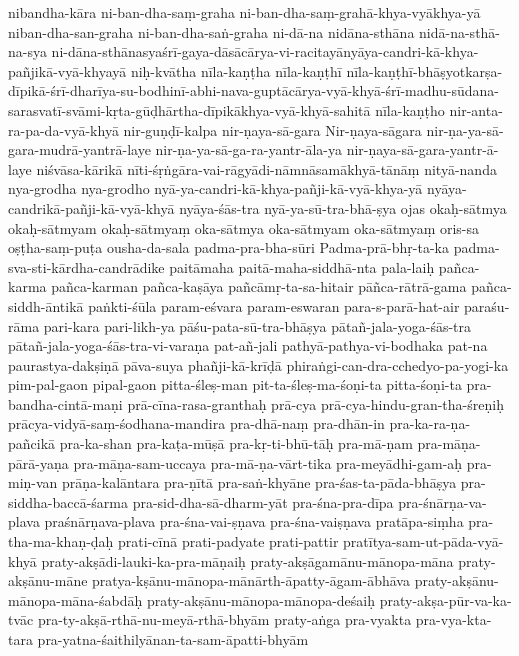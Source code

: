 {    nibandha-kāra
ni-ban-dha-saṃ-graha
ni-ban-dha-saṃ-grahā-khya-vyākhya-yā
niban-dha-san-graha
ni-ban-dha-saṅ-graha
ni-dā-na
    nidāna-sthāna
nidā-na-sthā-na-sya
ni-dāna-sthānasyaśrī-gaya-dāsācārya-vi-racitayānyāya-candri-kā-khya-pañjikā-vyā-khyayā
    niḥ-kvātha
nīla-kaṇṭha
    nīla-kaṇṭhī 
 nīla-kaṇṭhī-bhāṣyotkarṣa-dīpikā-śrī-dharīya-su-bodhinī-abhi-nava-guptācārya-vyā-khyā-śrī-madhu-sūdana-sarasvatī-svāmi-kṛta-gūḍhārtha-dīpikākhya-vyā-khyā-sahitā
    nīla-kaṇṭho
nir-anta-ra-pa-da-vyā-khyā
nir-guṇḍī-kalpa
nir-ṇaya-sā-gara
Nir-ṇaya-sāgara
nir-ṇa-ya-sā-gara-mudrā-yantrā-laye
nir-ṇa-ya-sā-ga-ra-yantr-āla-ya
nir-ṇaya-sā-gara-yantr-ā-laye
niśvāsa-kārikā
nīti-śṛṅgāra-vai-rāgyādi-nāmnāsamākhyā-tānāṃ
nityā-nanda
nya-grodha
nya-grodho
nyā-ya-candri-kā-khya-pañji-kā-vyā-khya-yā
nyāya-candrikā-pañji-kā-vyā-khyā
nyāya-śās-tra
    nyā-ya-sū-tra-bhā-ṣya
ojas
okaḥ-sātmya
okaḥ-sātmyam
okaḥ-sātmyaṃ
oka-sātmya
oka-sātmyam
oka-sātmyaṃ
oris-sa
oṣṭha-saṃ-puṭa
ousha-da-sala
padma-pra-bha-sūri
Padma-prā-bhṛ-ta-ka
padma-sva-sti-kārdha-candrādike
paitāmaha
paitā-maha-siddhā-nta
    pala-laiḥ 
pañca-karma
pañca-karman
pañca-kaṣāya
    pañcāmṛ-ta-sa-hitair
pāñca-rātrā-gama
pañca-siddh-āntikā
paṅkti-śūla
param-eśvara
param-eswaran
    para-s-parā-hat-air
paraśu-rāma
pari-kara
pari-likh-ya
pāśu-pata-sū-tra-bhāṣya
pātañ-jala-yoga-śās-tra
pātañ-jala-yoga-śās-tra-vi-varaṇa
pat-añ-jali
    pathyā-pathya-vi-bodhaka
pat-na
paurastya-dakṣiṇā
pāva-suya
phañji-kā-krīḍā
phiraṅgi-can-dra-cchedyo-pa-yogi-ka
pim-pal-gaon
pipal-gaon
pitta-śleṣ-man
pit-ta-śleṣ-ma-śoṇi-ta
pitta-śoṇi-ta
pra-bandha-cintā-maṇi
prā-cīna-rasa-granthaḥ
prā-cya
prā-cya-hindu-gran-tha-śreṇiḥ
prācya-vidyā-saṃ-śodhana-mandira
    pra-dhā-naṃ
pra-dhān-in
    pra-ka-ra-ṇa-pañcikā
pra-ka-shan
pra-kaṭa-mūṣā
pra-kṛ-ti-bhū-tāḥ
    pra-mā-ṇam
    pra-māṇa-pārā-yaṇa
    pra-māṇa-sam-uccaya
pra-mā-ṇa-vārt-tika
    pra-meyādhi-gam-aḥ
    pra-miṇ-van
prāṇa-kalāntara
pra-ṇītā
pra-saṅ-khyāne
pra-śas-ta-pāda-bhāṣya
    pra-siddha-baccā-śarma 
    pra-sid-dha-sā-dharm-yāt
pra-śna-pra-dīpa
pra-śnārṇa-va-plava
praśnārṇava-plava
pra-śna-vai-ṣṇava
pra-śna-vaiṣṇava
pratāpa-siṃha
    pra-tha-ma-khaṇ-ḍaḥ
prati-cīnā
prati-padyate
    prati-pattir
    pratītya-sam-ut-pāda-vyā-khyā
    praty-akṣādi-lauki-ka-pra-māṇaiḥ
    praty-akṣāgamānu-mānopa-māna
    praty-akṣānu-māne
    pratya-kṣānu-mānopa-mānārth-āpatty-āgam-ābhāva
    praty-akṣānu-mānopa-māna-śabdāḥ
    praty-akṣānu-mānopa-mānopa-deśaiḥ
    praty-akṣa-pūr-va-ka-tvāc 
    pra-ty-akṣā-rthā-nu-meyā-rthā-bhyām
    praty-aṅga
    pra-vyakta
     pra-vya-kta-tara
pra-yatna-śaithilyānan-ta-sam-āpatti-bhyām
}
